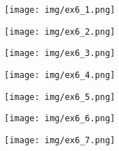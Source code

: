 \documentclass[12pt]{article}
\begin{document}
        \newpage

        \begin{figure}[h!]
            \centering
            \texttt{[image: img/ex6\_1.png]}
            \label{fig:ex6_1}
        \end{figure}
        \begin{figure}[h!]
            \centering
            \texttt{[image: img/ex6\_2.png]}
            \label{fig:ex6_2}
        \end{figure}
        \begin{figure}[h!]
            \centering
            \texttt{[image: img/ex6\_3.png]}
            \label{fig:ex6_3}
        \end{figure}
        \begin{figure}[h!]
            \centering
            \texttt{[image: img/ex6\_4.png]}
            \label{fig:ex6_4}
        \end{figure}
        \begin{figure}[h!]
            \centering
            \texttt{[image: img/ex6\_5.png]}
            \label{fig:ex6_5}
        \end{figure}
        \begin{figure}[h!]
            \centering
            \texttt{[image: img/ex6\_6.png]}
            \label{fig:ex6_6}
        \end{figure}
        \begin{figure}[h!]
            \centering
            \texttt{[image: img/ex6\_7.png]}
            \label{fig:ex6_7}
        \end{figure}
\end{document}
